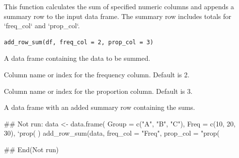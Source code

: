 \documentclass[a4paper]{book}
\begin{document}
%
\begin{Description}
This function calculates the sum of specified numeric columns and appends a summary row
to the input data frame. The summary row includes totals for `freq\_col` and `prop\_col`.
\end{Description}
%
\begin{Usage}
\begin{verbatim}
add_row_sum(df, freq_col = 2, prop_col = 3)
\end{verbatim}
\end{Usage}
%
\begin{Arguments}
\begin{ldescription}
\item[\code{df}] A data frame containing the data to be summed.

\item[\code{freq\_col}] Column name or index for the frequency column. Default is 2.

\item[\code{prop\_col}] Column name or index for the proportion column. Default is 3.
\end{ldescription}
\end{Arguments}
%
\begin{Value}
A data frame with an added summary row containing the sums.
\end{Value}
%
\begin{Examples}
\begin{ExampleCode}
\#\# Not run: 
data <- data.frame(
  Group = c("A", "B", "C"),
  Freq = c(10, 20, 30),
  `prop(%
)
add_row_sum(data, freq_col = "Freq", prop_col = "prop(%

## End(Not run)
\end{ExampleCode}
\end{Examples}
\end{document}
